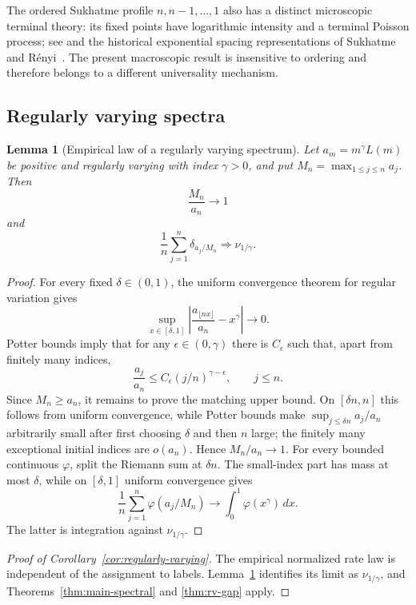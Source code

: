 \documentclass[11pt]{article}
\newtheorem{lemma}[theorem]{Lemma}
\theoremstyle{definition}
\theoremstyle{remark}
\newcommand{\dd}{\,d}
\begin{document}
The ordered Sukhatme profile $n,n-1,\ldots,1$ also has a distinct microscopic
terminal theory: its fixed points have logarithmic intensity and a terminal
Poisson process; see \cite{LongSukhatme2026} and the historical exponential
spacing representations of Sukhatme~\cite{Sukhatme1937} and
R\'enyi~\cite{Renyi1953}.  The present macroscopic result is insensitive to
ordering and therefore belongs to a different universality mechanism.

\subsection{Regularly varying spectra}

\begin{lemma}[Empirical law of a regularly varying spectrum]
\label{lem:rv-empirical}
Let $a_m=m^\gamma L(m)$ be positive and regularly varying with index
$\gamma>0$, and put $M_n=\max_{1\le j\le n}a_j$.  Then
\[
 \frac{M_n}{a_n}\longrightarrow1
\]
and
\begin{equation}
 \frac1n\sum_{j=1}^n\delta_{a_j/M_n}
 \Rightarrow\nu_{1/\gamma}.
 \label{eq:rv-empirical}
\end{equation}
\end{lemma}

\begin{proof}
For every fixed $\delta\in(0,1)$, the uniform convergence theorem for regular
variation gives
\[
 \sup_{x\in[\delta,1]}
 \left|\frac{a_{\lfloor nx\rfloor}}{a_n}-x^\gamma\right|\to0.
\]
Potter bounds imply that for any $\epsilon\in(0,\gamma)$ there is $C_\epsilon$
such that, apart from finitely many indices,
\[
 \frac{a_j}{a_n}\le C_\epsilon(j/n)^{\gamma-\epsilon},
 \qquad j\le n.
\]
Since $M_n\ge a_n$, it remains to prove the matching upper bound.  On
$[\delta n,n]$ this follows from uniform convergence, while Potter bounds make
$\sup_{j\le\delta n}a_j/a_n$ arbitrarily small after first choosing $\delta$
and then $n$ large; the finitely many exceptional initial indices are
$o(a_n)$.  Hence $M_n/a_n\to1$.  For every bounded continuous $\varphi$, split
the Riemann sum at $\delta n$.  The small-index part has mass at most $\delta$, while on
$[\delta,1]$ uniform convergence gives
\[
 \frac1n\sum_{j=1}^n\varphi(a_j/M_n)
 \longrightarrow\int_0^1\varphi(x^\gamma)\dd x.
\]
The latter is integration against $\nu_{1/\gamma}$.
\end{proof}

\begin{proof}[Proof of Corollary~\ref{cor:regularly-varying}]
The empirical normalized rate law is independent of the assignment to labels.
Lemma~\ref{lem:rv-empirical} identifies its limit as
$\nu_{1/\gamma}$, and Theorems~\ref{thm:main-spectral} and
\ref{thm:rv-gap} apply.
\end{proof}
\end{document}
